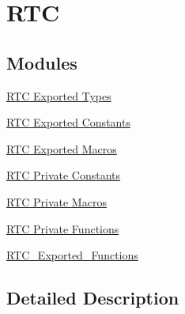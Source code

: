 \hypertarget{group___r_t_c}{}\section{R\+TC}
\label{group___r_t_c}
\subsection*{Modules}
\begin{DoxyCompactItemize}
\item 
\hyperlink{group___r_t_c___exported___types}{R\+T\+C Exported Types}
\item 
\hyperlink{group___r_t_c___exported___constants}{R\+T\+C Exported Constants}
\item 
\hyperlink{group___r_t_c___exported___macros}{R\+T\+C Exported Macros}
\item 
\hyperlink{group___r_t_c___private___constants}{R\+T\+C Private Constants}
\item 
\hyperlink{group___r_t_c___private___macros}{R\+T\+C Private Macros}
\item 
\hyperlink{group___r_t_c___private___functions}{R\+T\+C Private Functions}
\item 
\hyperlink{group___r_t_c___exported___functions}{R\+T\+C\+\_\+\+Exported\+\_\+\+Functions}
\end{DoxyCompactItemize}


\subsection{Detailed Description}
